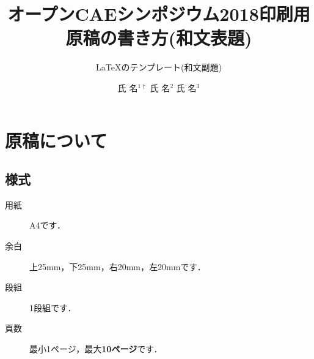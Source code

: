 \documentclass{ltjoc}
\title{オープンCAEシンポジウム2018印刷用原稿の書き方(和文表題)}
\subtitle{\LaTeX のテンプレート(和文副題)}
\author{%
氏 名$^{1\dagger}$%
\hspace{1\zw}%
氏 名$^{2}$%
\hspace{1\zw}%
氏 名$^{3}$%
}
\affiliation{%
${}^{1}$所属%
\hspace{1\zw}%
${}^{2}$所属%
\hspace{1\zw}%
${}^{3}$所属%
}
\begin{document}
\maketitle
\section{原稿について}
\subsection{様式}
\begin{description}
\item [用紙]
  A4です．
\item [余白]
  上25mm，下25mm，右20mm，左20mmです．
\item [段組]
  1段組です．
\item [頁数]
  最小1ページ，最大{\bfseries 10ページ}です．
\end{description}
\end{document}
